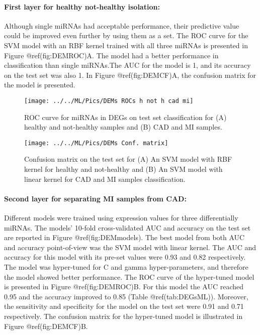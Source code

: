 \documentclass[smallextended]{svjour3}       %
\begin{document}
\hypertarget{first-layer-for-healthy-not-healthy-isolation}{%
\paragraph{First layer for healthy not-healthy
isolation:}\label{first-layer-for-healthy-not-healthy-isolation}}

Although single miRNAs had acceptable performance, their predictive
value could be improved even further by using them as a set. The ROC
curve for the SVM model with an RBF kernel trained with all three miRNAs
is presented in Figure @ref(fig:DEMROC)A. The model had a better
performance in classification than single miRNAs.The AUC for the model
is 1, and its accuracy on the test set was also 1. In Figure
@ref(fig:DEMCF)A, the confusion matrix for the model is presented.

\begin{figure}

{\centering \texttt{[image: ../../ML/Pics/DEMs ROCs h not h cad mi]} 

}

\caption{ROC curve for miRNAs in DEGs on test set classification for (A) healthy and not-healthy samples and (B) CAD and MI samples.}\label{fig:DEMROC}
\end{figure}

\begin{figure}

{\centering \texttt{[image: ../../ML/Pics/DEMs Conf. matrix]} 

}

\caption{Confusion matrix on the test set for (A) An SVM model with RBF kernel for healthy and not-healthy and (B) An SVM model with linear kernel for CAD and MI samples classification.}\label{fig:DEMCF}
\end{figure}

\hypertarget{second-layer-for-separating-mi-samples-from-cad}{%
\paragraph{Second layer for separating MI samples from
CAD:}\label{second-layer-for-separating-mi-samples-from-cad}}

Different models were trained using expression values for three
differentially miRNAs. The models' 10-fold cross-validated AUC and
accuracy on the test set are reported in Figure @ref(fig:DEMmodels). The
best model from both AUC and accuracy point-of-view was the SVM model
with linear kernel. The AUC and accuracy for this model with its pre-set
values were 0.93 and 0.82 respectively. The model was hyper-tuned for C
and gamma hyper-parameters, and therefore the model showed better
performance. The ROC curve of the hyper-tuned model is presented in
Figure @ref(fig:DEMROC)B. For this model the AUC reached 0.95 and the
accuracy improved to 0.85 (Table @ref(tab:DEGsML)). Moreover, the
sensitivity and specificity for the model on the test set were 0.91 and
0.71 respectively. The confusion matrix for the hyper-tuned model is
illustrated in Figure @ref(fig:DEMCF)B.
\end{document}
